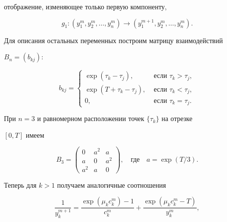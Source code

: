 отображение, изменяющее только первую компоненту,


$$


g_1: (y_1^m, y_2^m,\dotsc,y_n^m) \to (y_1^{m+1},y_2^m,\dotsc,y_n^m).


$$


 


Для описания остальных переменных построим матрицу взаимодействий 


$B_n=(b_{kj})$:


$$


b_{kj}=


\begin{cases}


\exp(\tau_k-\tau_j),  & \text{ если } \tau_k>\tau_j,\\


\exp(T+\tau_k-\tau_j), &\text{ если } \tau_k<\tau_j,\\


 0,          &\text{ если } \tau_k=\tau_j.


\end{cases}


$$


При $n=3$ и равномерном расположении точек $\{\tau_k\}$ на отрезке 


$[0,T]$ имеем


$$


B_3=


\begin{pmatrix}


0  & a^2 & a\\


a  & 0  & a^2\\


a^2 & a  & 0


\end{pmatrix}


,\quad\text{где}\quad a=\exp(T/3).


$$


Теперь для $k>1$ получаем аналогичные соотношения


\begin{equation}


\frac{1}{y_k^{m+1}}=


\frac{\exp(\mu_kc_k^m)-1}{c_k^m}+


\frac{\exp(\mu_kc_k^m-T)}{y_k^m},


\label{2.3}


\end{equation}


